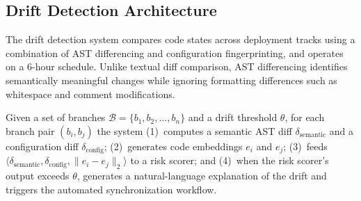 \documentclass{ieeeaccess}
\begin{document}
\subsection{Drift Detection Architecture}
The drift detection system compares code states across deployment tracks using a combination of AST differencing and configuration fingerprinting, and operates on a 6-hour schedule. Unlike textual diff comparison, AST differencing identifies semantically meaningful changes while ignoring formatting differences such as whitespace and comment modifications.

Given a set of branches $\mathcal{B} = \{b_1, b_2, \ldots, b_n\}$ and a drift threshold $\theta$, for each branch pair $(b_i, b_j)$ the system (1)~computes a semantic AST diff $\delta_{\mathrm{semantic}}$ and a configuration diff $\delta_{\mathrm{config}}$; (2)~generates code embeddings $e_i$ and $e_j$; (3)~feeds $\langle \delta_{\mathrm{semantic}}, \delta_{\mathrm{config}}, \lVert e_i - e_j \rVert_2 \rangle$ to a risk scorer; and (4)~when the risk scorer's output exceeds $\theta$, generates a natural-language explanation of the drift and triggers the automated synchronization workflow.
\end{document}
